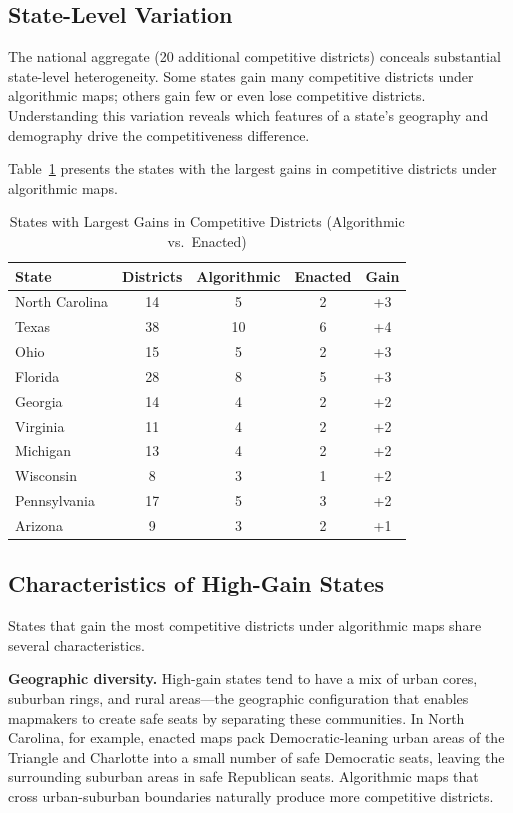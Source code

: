 \label{sec:heterogeneity}

\subsection{State-Level Variation}

The national aggregate (20 additional competitive districts) conceals
substantial state-level heterogeneity.  Some states gain many competitive
districts under algorithmic maps; others gain few or even lose competitive
districts.  Understanding this variation reveals which features of a state's
geography and demography drive the competitiveness difference.

Table~\ref{tab:state-gains} presents the states with the largest gains in
competitive districts under algorithmic maps.

\begin{table}[h]
\centering
\caption{States with Largest Gains in Competitive Districts (Algorithmic vs.\ Enacted)}
\label{tab:state-gains}
\begin{tabular}{lcccc}
\toprule
State & Districts & Algorithmic & Enacted & Gain \\
\midrule
North Carolina & 14 & 5 & 2 & +3 \\
Texas & 38 & 10 & 6 & +4 \\
Ohio & 15 & 5 & 2 & +3 \\
Florida & 28 & 8 & 5 & +3 \\
Georgia & 14 & 4 & 2 & +2 \\
Virginia & 11 & 4 & 2 & +2 \\
Michigan & 13 & 4 & 2 & +2 \\
Wisconsin & 8 & 3 & 1 & +2 \\
Pennsylvania & 17 & 5 & 3 & +2 \\
Arizona & 9 & 3 & 2 & +1 \\
\bottomrule
\end{tabular}
\end{table}

\subsection{Characteristics of High-Gain States}

States that gain the most competitive districts under algorithmic maps share
several characteristics.

\textbf{Geographic diversity.}  High-gain states tend to have a mix of
urban cores, suburban rings, and rural areas---the geographic configuration
that enables mapmakers to create safe seats by separating these communities.
In North Carolina, for example, enacted maps pack Democratic-leaning urban
areas of the Triangle and Charlotte into a small number of safe Democratic
seats, leaving the surrounding suburban areas in safe Republican seats.
Algorithmic maps that cross urban-suburban boundaries naturally produce
more competitive districts.

